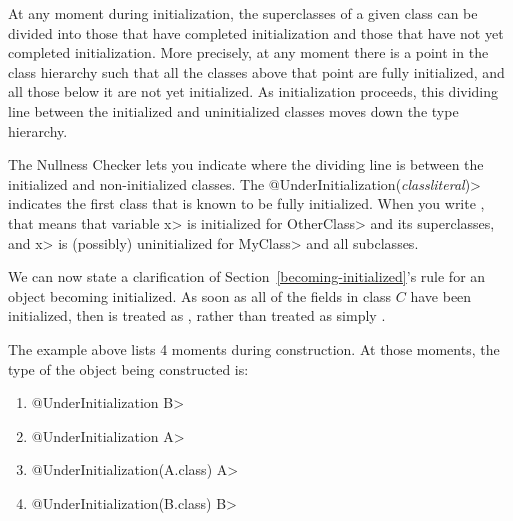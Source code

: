 At any moment during initialization, the superclasses of a given class
can be divided into those that have completed initialization and those that
have not yet completed initialization.  More precisely, at any moment there
is a point in the class hierarchy such that all the classes above that
point are fully initialized, and all those below it are not yet
initialized.  As initialization proceeds, this dividing line between the
initialized and uninitialized classes moves down the type hierarchy.

The Nullness Checker lets you indicate where the dividing line is between
the initialized and non-initialized classes.
The \<@UnderInitialization(\emph{classliteral})>
indicates the first class that is known to be fully initialized.
When you write , that
means that variable \<x> is initialized for \<OtherClass> and its
superclasses, and \<x> is (possibly) uninitialized for \<MyClass> and all subclasses.

\label{becoming-initialized-clarification}

We can now state a clarification of Section~\ref{becoming-initialized}'s rule
for an object becoming initialized.
As soon as all of the  fields
in class $C$ have been initialized, then  is treated as
, rather than
treated as simply 
.

The example above lists 4 moments during construction.  At those moments,
the type of the object being constructed is:

\begin{enumerate}
\item
  \<@UnderInitialization B>
\item
  \<@UnderInitialization A>
\item
  \<@UnderInitialization(A.class) A>
\item
  \<@UnderInitialization(B.class) B>
\end{enumerate}

